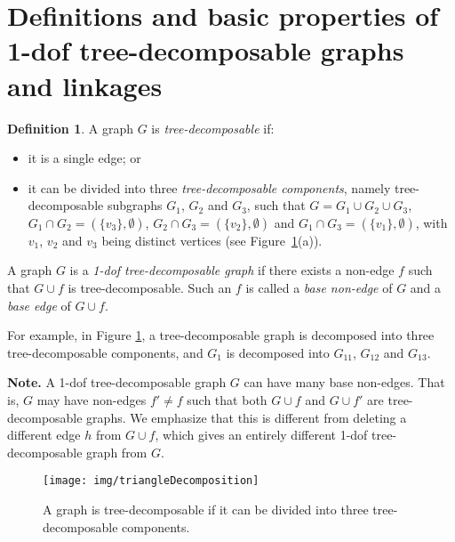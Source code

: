 \documentclass[secthm,amsthm,english]{article}
\theoremstyle{definition}
\newtheorem{definition}{Definition}
\theoremstyle{remark}
\begin{document}
\section{Definitions and basic properties of 1-dof tree-decomposable graphs and linkages}
\label{sec:Basic-properties}

\begin{definition}
\label{def:t-decomp}
A graph $G$ is {\emph{tree-decomposable}} if: 

\begin{itemize}
	\item it is a single edge; or 

	\item it can be divided into three {\emph{tree-decomposable components}}, namely tree-decomposable subgraphs $G_{1}$,
	$G_{2}$ and $G_{3}$, such that $G=G_{1}\cup G_{2}\cup G_{3}$, $G_{1}\cap G_{2}=(\{v_{3}\},\emptyset)$,
	$G_{2}\cap G_{3}=(\{v_{2}\},\emptyset)$ and $G_{1}\cap G_{3}=(\{v_{1}\},\emptyset)$,
	with $v_{1}$, $v_{2}$ and $v_{3}$ being distinct vertices
	(see Figure~\ref{F:triangleDecomposition}(a)). 
\end{itemize}
A graph $G$ is a {\emph{1-dof tree-decomposable graph}}
if there exists a non-edge $f$ such that $G \cup f$ is tree-decomposable.
Such an $f$ is called a {\emph{base non-edge}}
of $G$ and a {\emph{base edge}} of $G\cup f$.
\end{definition}


 For example, in Figure \ref{F:triangleDecomposition}, a tree-decomposable graph is decomposed into three tree-decomposable components, and $G_{1}$ is decomposed into $G_{11}$, $G_{12}$ and $G_{13}$.

\smallskip

\noindent\textbf{Note.}
A 1-dof tree-decomposable graph $G$ can have many base non-edges. 
That is, $G$ may have non-edges $f'\ne f$ such that both $G \cup f$ and $G\cup f'$ are tree-decomposable graphs. 
We emphasize that this is different from deleting a different
edge $h$ from $G\cup f$, which  gives an entirely different 1-dof tree-decomposable graph from $G$.  

\begin{figure}[h]
	  
	  
	   
	 
	
	\begin{centering}
	\texttt{[image: img/triangleDecomposition]} 
	\par\end{centering}
	
	\caption{A graph is tree-decomposable if it can be divided into three
	tree-decomposable components. }

\label{F:triangleDecomposition} 
\end{figure}
\end{document}
